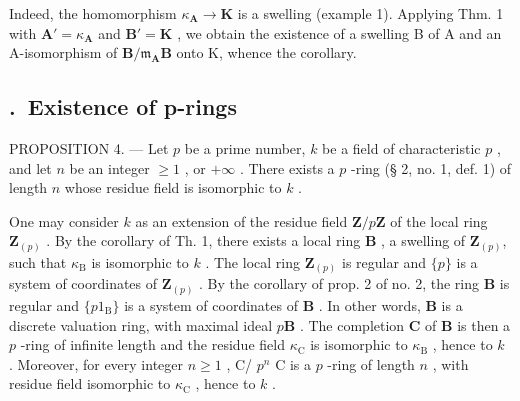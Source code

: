 Indeed, the homomorphism \(\kappa_{\mathbf{A}} \to \mathbf{K}\) is a swelling (example 1). Applying Thm. 1 with \(\mathbf{A}' = \kappa_{\mathbf{A}}\) and \(\mathbf{B}' = \mathbf{K}\) , we obtain the existence of a swelling B of A and an A-isomorphism of \(\mathbf{B} / \mathfrak{m}_{\mathbf{A}}\mathbf{B}\) onto K, whence the corollary.

\subsection*{\theappendixitem.\ Existence of p-rings}
{}

PROPOSITION 4. --- Let \(p\) be a prime number, \(k\) be a field of characteristic \(p\) , and let \(n\) be an integer \(\geqslant 1\) , or \(+\infty\) . There exists a \(p\) -ring (§ 2, no. 1, def. 1) of length \(n\) whose residue field is isomorphic to \(k\) .

One may consider \(k\) as an extension of the residue field \(\mathbf{Z}/p\mathbf{Z}\) of the local ring \(\mathbf{Z}_{(p)}\) . By the corollary of Th. 1, there exists a local ring \(\mathbf{B}\) , a swelling of \(\mathbf{Z}_{(p)}\), such that \(\kappa_{\mathrm{B}}\) is isomorphic to \(k\) . The local ring \(\mathbf{Z}_{(p)}\) is regular and \(\{p\}\) is a system of coordinates of \(\mathbf{Z}_{(p)}\) . By the corollary of prop. 2 of no. 2, the ring \(\mathbf{B}\) is regular and \(\{p1_{\mathrm{B}}\}\) is a system of coordinates of \(\mathbf{B}\) . In other words, \(\mathbf{B}\) is a discrete valuation ring, with maximal ideal \(p\mathbf{B}\) . The completion \(\mathbf{C}\) of \(\mathbf{B}\) is then a \(p\) -ring of infinite length and the residue field \(\kappa_{\mathrm{C}}\) is isomorphic to \(\kappa_{\mathrm{B}}\) , hence to \(k\) . Moreover, for every integer \(n \geqslant 1\) , C/ \(p^{n}\) C is a \(p\) -ring of length \(n\) , with residue field isomorphic to \(\kappa_{\mathrm{C}}\) , hence to \(k\) .

\setcounter{exercisesection}{0}
